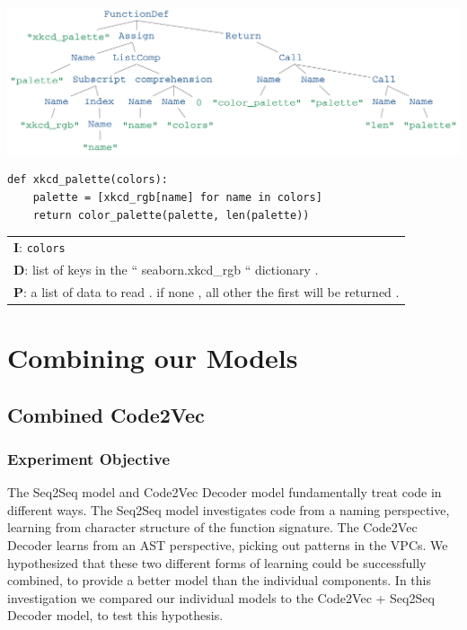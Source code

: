 \begin{listing}[h!] 
\begin{center}

\includegraphics[width=\linewidth]{ImagesCodeRelated/xkcd_palette_strip.png}
\begin{verbatim}
def xkcd_palette(colors):
    palette = [xkcd_rgb[name] for name in colors]
    return color_palette(palette, len(palette))

\end{verbatim}
\begin{tabular}{l}
\textbf{I}: \texttt{colors}\\
\textbf{D}: list of keys in the `` seaborn.xkcd\_rgb `` dictionary .\\
\textbf{P}: a list of data to read . if none , all other the first will be returned .\\
\end{tabular}
\end{center}
\end{listing}


\section{Combining our Models} %
\label{sec:investigating_combined_channels}


\subsection{Combined Code2Vec } %
\label{sub:combined_code2vec}


\subsubsection{Experiment Objective} %

The Seq2Seq model and Code2Vec Decoder model fundamentally treat code in different ways.
The Seq2Seq model investigates code from a naming perspective, learning from character structure of the function signature.
The Code2Vec Decoder learns from an AST perspective, picking out patterns in the VPCs. 
We hypothesized that these two different forms of learning could be successfully combined, to provide a better model than the individual components.
In this investigation we compared our individual models to the Code2Vec + Seq2Seq Decoder model, to test this hypothesis.

